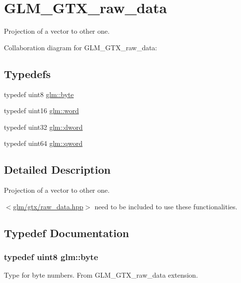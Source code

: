\hypertarget{group__gtx__raw__data}{}\section{G\+L\+M\+\_\+\+G\+T\+X\+\_\+raw\+\_\+data}
\label{group__gtx__raw__data}


Projection of a vector to other one.  


Collaboration diagram for G\+L\+M\+\_\+\+G\+T\+X\+\_\+raw\+\_\+data\+:
\subsection*{Typedefs}
\begin{DoxyCompactItemize}
\item 
typedef uint8 \hyperlink{group__gtx__raw__data_ga17ff8c36ad3112b3f2ad7a35452b78af}{glm\+::byte}
\item 
typedef uint16 \hyperlink{group__gtx__raw__data_ga9325d3875c8b96762adac1ae5ed701f4}{glm\+::word}
\item 
typedef uint32 \hyperlink{group__gtx__raw__data_ga2ef8dddba26f43cba016c86f947294c1}{glm\+::dword}
\item 
typedef uint64 \hyperlink{group__gtx__raw__data_ga4f57913334aae35981524f5e968478f7}{glm\+::qword}
\end{DoxyCompactItemize}


\subsection{Detailed Description}
Projection of a vector to other one. 

$<$\hyperlink{raw__data_8hpp}{glm/gtx/raw\+\_\+data.\+hpp}$>$ need to be included to use these functionalities. 

\subsection{Typedef Documentation}
\hypertarget{group__gtx__raw__data_ga17ff8c36ad3112b3f2ad7a35452b78af}{}
\subsubsection[{byte}]{\setlength{\rightskip}{0pt plus 5cm}typedef uint8 {\bf glm\+::byte}}\label{group__gtx__raw__data_ga17ff8c36ad3112b3f2ad7a35452b78af}
Type for byte numbers. From G\+L\+M\+\_\+\+G\+T\+X\+\_\+raw\+\_\+data extension. \hypertarget{group__gtx__raw__data_ga2ef8dddba26f43cba016c86f947294c1}{}
